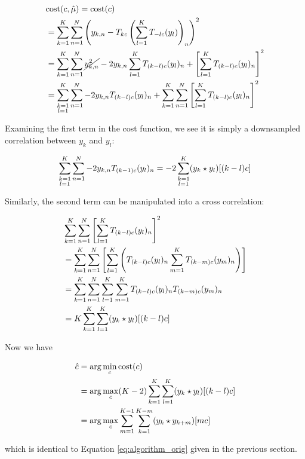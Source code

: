 \documentclass{article}
\newcommand\lstar{\mkern4mu{\star}\mkern4mu}
\begin{document}
\begin{align*}
  &\text{cost}(c, \hat{\mu}) = \text{cost}(c) \\
  &=\sum_{k=1}^K \sum_{n=1}^N \left(y_{k,n} - T_{kc}\left(\sum_{l=1}^K T_{-lc}(y_l)\right)_n\right)^2 \\
  &=\sum_{k=1}^K \sum_{n=1}^N \cancel{y_{k,n}^2} -2y_{k,n}\sum_{l=1}^K T_{(k-l)c}(y_l)_n + \left[\sum_{l=1}^K T_{(k-l)c}(y_l)_n\right]^2 \\
  &=\sum_{\substack{k=1 \\ l=1}}^K \sum_{n=1}^N -2y_{k,n} T_{(k-l)c}(y_l)_n +
  \sum_{k=1}^K \sum_{n=1}^N \left[\sum_{l=1}^K T_{(k-l)c}(y_l)_n\right]^2 \\
\end{align*}

Examining the first term in the cost function, we see it is simply a downsampled correlation between $y_k$ and $y_l$:

$$\sum_{\substack{k=1 \\ l=1}}^K \sum_{n=1}^N -2y_{k,n} T_{(k-1)c}(y_l)_n = -2\sum_{\substack{k=1 \\ l=1}}^K (y_k \lstar y_l) [(k-l)c]$$

Similarly, the second term can be manipulated into a cross correlation:

\begin{align*}
  &\sum_{k=1}^K \sum_{n=1}^N \left[\sum_{l=1}^K T_{(k-l)c}(y_l)_n\right]^2 \\
  &= \sum_{k=1}^K \sum_{n=1}^N \left[\sum_{l=1}^K \left( T_{(k-l)c}(y_l)_n \sum_{m=1}^K T_{(k-m)c}(y_m)_n \right)\right] \\
  &= \sum_{k=1}^K \sum_{n=1}^N \sum_{l=1}^K \sum_{m=1}^K T_{(k-l)c}(y_l)_n T_{(k-m)c}(y_m)_n \\
  &= K \sum_{k=1}^K \sum_{l=1}^K (y_k \lstar y_l)[(k-l)c]
\end{align*}

Now we have

\begin{align*}
  \hat{c} &= \arg \min_c \text{cost}(c) \\
  &= \arg \max_c (K - 2) \sum_{k=1}^K \sum_{l=1}^K (y_k \lstar y_l)[(k - l)c] \\
  &= \arg \max_c \sum_{m=1}^{K-1} \sum_{k=1}^{K-m} (y_k \lstar y_{k+m})[mc]
\end{align*}

which is identical to Equation \ref{eq:algorithm_orig} given in the previous section.

\end{document}
